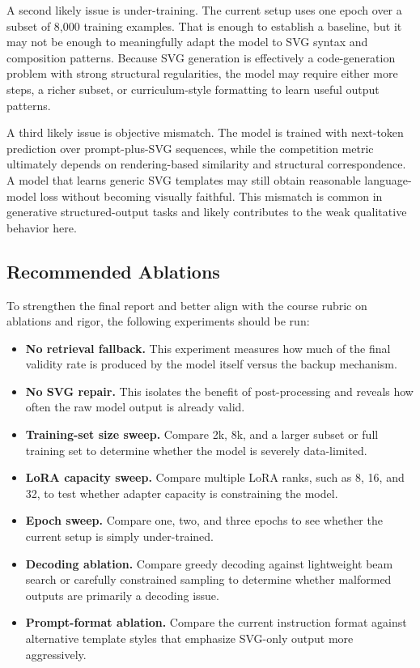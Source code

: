 \documentclass[11pt]{article}
\begin{document}
A second likely issue is under-training. The current setup uses one epoch over a subset of 8,000 training examples. That is enough to establish a baseline, but it may not be enough to meaningfully adapt the model to SVG syntax and composition patterns. Because SVG generation is effectively a code-generation problem with strong structural regularities, the model may require either more steps, a richer subset, or curriculum-style formatting to learn useful output patterns.

A third likely issue is objective mismatch. The model is trained with next-token prediction over prompt-plus-SVG sequences, while the competition metric ultimately depends on rendering-based similarity and structural correspondence. A model that learns generic SVG templates may still obtain reasonable language-model loss without becoming visually faithful. This mismatch is common in generative structured-output tasks and likely contributes to the weak qualitative behavior here.

\subsection{Recommended Ablations}
To strengthen the final report and better align with the course rubric on ablations and rigor, the following experiments should be run:

\begin{itemize}
\item \textbf{No retrieval fallback.} This experiment measures how much of the final validity rate is produced by the model itself versus the backup mechanism.
\item \textbf{No SVG repair.} This isolates the benefit of post-processing and reveals how often the raw model output is already valid.
\item \textbf{Training-set size sweep.} Compare 2k, 8k, and a larger subset or full training set to determine whether the model is severely data-limited.
\item \textbf{LoRA capacity sweep.} Compare multiple LoRA ranks, such as 8, 16, and 32, to test whether adapter capacity is constraining the model.
\item \textbf{Epoch sweep.} Compare one, two, and three epochs to see whether the current setup is simply under-trained.
\item \textbf{Decoding ablation.} Compare greedy decoding against lightweight beam search or carefully constrained sampling to determine whether malformed outputs are primarily a decoding issue.
\item \textbf{Prompt-format ablation.} Compare the current instruction format against alternative template styles that emphasize SVG-only output more aggressively.
\end{itemize}
\end{document}
